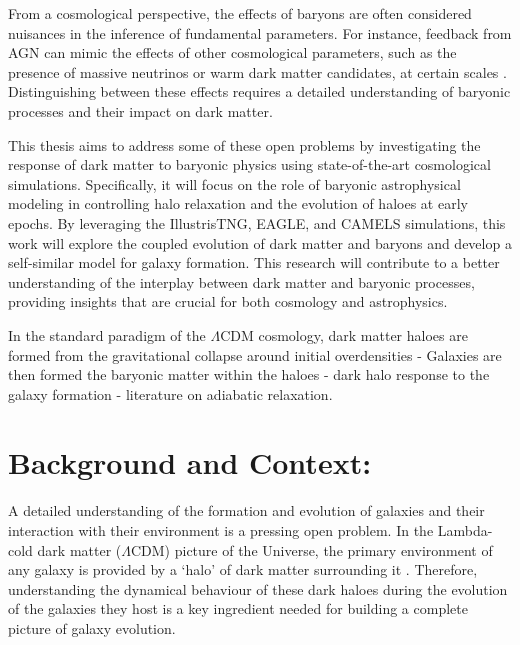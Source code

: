 From a cosmological perspective, the effects of baryons are often considered nuisances in the inference of fundamental parameters. For instance, feedback from AGN can mimic the effects of other cosmological parameters, such as the presence of massive neutrinos or warm dark matter candidates, at certain scales \citep{2019Chisari_etal_Baryfeedback,2020AricoAnguloetal_baryonifi}. Distinguishing between these effects requires a detailed understanding of baryonic processes and their impact on dark matter.

This thesis aims to address some of these open problems by investigating the response of dark matter to baryonic physics using state-of-the-art cosmological simulations. Specifically, it will focus on the role of baryonic astrophysical modeling in controlling halo relaxation and the evolution of haloes at early epochs. By leveraging the IllustrisTNG, EAGLE, and CAMELS simulations, this work will explore the coupled evolution of dark matter and baryons and develop a self-similar model for galaxy formation. This research will contribute to a better understanding of the interplay between dark matter and baryonic processes, providing insights that are crucial for both cosmology and astrophysics.



In the standard paradigm of the $\Lambda$CDM cosmology, dark matter haloes are formed from the gravitational collapse around initial overdensities - Galaxies are then formed the baryonic matter within the haloes - dark halo response to the galaxy formation - literature on adiabatic relaxation.

\section{Background and Context:}
A detailed understanding of the formation and evolution of galaxies and their interaction with their environment is a pressing open problem. 
In the Lambda-cold dark matter ($\Lambda$CDM) picture of the Universe, the primary environment of any galaxy is provided by a `halo' of dark matter surrounding it \citep[e.g.,][]{wr78}. 
Therefore, understanding the dynamical behaviour of these dark haloes during the evolution of the galaxies they host is a key ingredient needed for building a complete picture of galaxy evolution.

